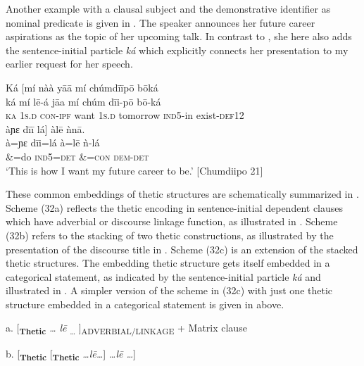 \documentclass[output=paper]{langsci/langscibook}
\begin{document}
Another example with a clausal subject and the demonstrative identifier as nominal predicate is given in . The speaker announces her future career aspirations as the topic of her upcoming talk. In contrast to , she here also adds the sentence-initial particle \textit{ká} which explicitly connects her presentation to my earlier request for her speech.

\ea\label{ex:schwarz:31}
\glll   Ká  \textup{[}mí    nàà    y\={a}\={a}    mí    chúmd\={i}\={i}p\={o}            b\={o}ká\\
    \textup{ká}   mí    l\={e}-á      j\={a}a    mí    chúm        d\={i}i-p\={o}    {b\={o}-ká}\\
     \textsc{  ka}   1\textsc{s.d}  \textsc{con-ipf}    want  1\textsc{s}.\textsc{d } tomorrow     \textsc{ind}5-in     exist-\textsc{def}12\\
\glll   àɲɛ    d\={i}\={i}   lá\textup{]   } àl\={e}    ǹn\={a}.\\
    \textup{à=ɲɛ  d\={i}i=lá    à=l\={e}    ǹ-lá}\\
       \&=do  \textsc{ind}\textsc{5=}\textsc{det}\textsc{  \&=}\textsc{con}\textsc{ } \textsc{dem-det}\\
\glt ‘This is how I want my future career to be.’ [Chumdiipo 21]\\

\z

These common embeddings of thetic structures are schematically summarized in . Scheme (32a) reflects the thetic encoding in sentence-initial dependent clauses which have adverbial or discourse linkage function, as illustrated in . Scheme (32b) refers to the stacking of two thetic constructions, as illustrated by the presentation of the discourse title in . Scheme (32c) is an extension of the stacked thetic structures. The embedding thetic structure gets itself embedded in a categorical statement, as indicated by the sentence-initial particle \textit{ká} and illustrated in . A simpler version of the scheme in (32c) with just one thetic structure embedded in a categorical statement is given in  above. 

\ea\label{ex:schwarz:32}
{a.  [\textbf{\textsubscript{Thetic}} \textit{… l\={e}}\textsubscript{ …} ]\textsubscript{ADVERBIAL/LINKAGE} + Matrix clause} 

    b.   [\textbf{\textsubscript{Thetic}} [\textbf{\textsubscript{Thetic}} \textit{…l\={e}…}] \textit{…l\={e} …}]
\end{document}
